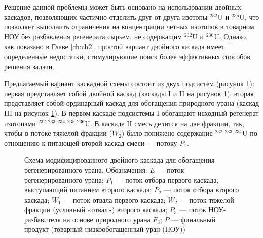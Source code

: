 Решение данной проблемы может быть основано на использовании двойных каскадов, позволяющих частично отделить друг от друга изотопы $^{232}$U и $^{235}$U, что позволяет выполнить ограничения на концентрации четных изотопов в товарном НОУ без разбавления регенерата сырьем, не содержащим $^{232}$U и $^{236}$U. Однако, как показано в Главе \ref{ch:ch2}, простой вариант двойного каскада имеет определенные недостатки, стимулирующие поиск более эффективных способов решения задачи. 

Предлагаемый вариант каскадной схемы состоит из двух подсистем (рисунок \ref{p2left}): первая представляет собой двойной каскад (каскады I и II на рисунок \ref{p2left}), вторая представляет собой ординарный каскад для обогащения природного урана (каскад III на рисунок \ref{p2left}). В первом каскаде подсистемы I обогащают исходный регенерат изотопами $^{232,233,234,235,236}$U. В каскаде II смесь делится на две фракции, так, чтобы в потоке тяжелой фракции ($W_2$) было понижено содержание $^{232,233,234}$U по отношению к питающей второй каскад смеси --- потоку $P_1$. 

\begin{figure}[ht]
    \caption{Схема модифицированного двойного каскада для обогащения регенерированного урана. Обозначения: $E$ --- поток регенерированного урана; $P_1$ --- поток отбора первого каскада, выступающий питанием второго каскада; $P_2$ --- поток отбора второго каскада; $W_1$ --- поток отвала первого каскада; $W_2$ --- поток тяжелой фракции (условный «отвал») второго каскада; $P_3$ --- поток НОУ-разбавителя  на основе природного урана $F_3$; $P$ --- финальный продукт (товарный низкообогащенный уран (НОУ))}\label{p2left}
\end{figure}

\newpage

